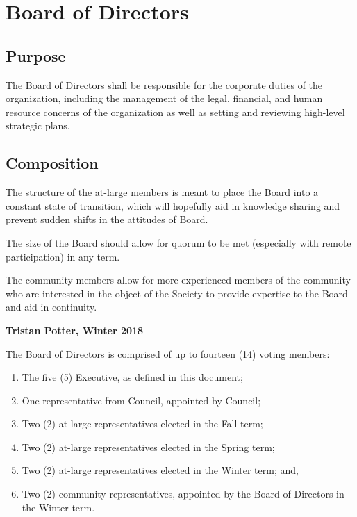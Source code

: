 \section{Board of Directors}
\subsection{Purpose}
The Board of Directors shall be responsible for the corporate duties of the
organization, including the management of the legal, financial, and human
resource concerns of the organization as well as setting and reviewing
high-level strategic plans.

\subsection{Composition}
\begin{annotation}
    The structure of the at-large members is meant to place the Board into
    a constant state of transition, which will hopefully aid in knowledge
    sharing and prevent sudden shifts in the attitudes of Board. 

    The size of the Board should allow for quorum to be met (especially with
    remote participation) in any term. 

    The community members allow for more experienced members of the community
    who are interested in the object of the Society to provide expertise to the
    Board and aid in continuity.

    \textbf{Tristan Potter, Winter 2018}
\end{annotation}

The Board of Directors is comprised of up to fourteen (14) voting members:
\begin{enumerate}
    \item The five (5) Executive, as defined in this document; 
    \item One representative from Council, appointed by Council; 
    \item Two (2) at-large representatives elected in the Fall term;
    \item Two (2) at-large representatives elected in the Spring term;
    \item Two (2) at-large representatives elected in the Winter term; and,
    \item Two (2) community representatives, appointed by the Board of 
        Directors in the Winter term.
\end{enumerate}

